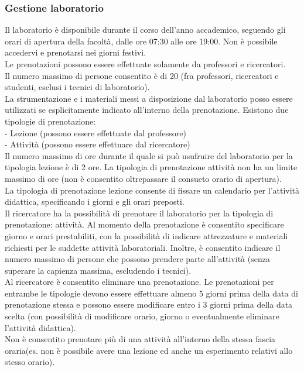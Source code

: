 \documentclass[11pt,a4paper]{report}
\begin{document}
\subsubsection{Gestione laboratorio}
Il laboratorio è disponibile durante il corso dell’anno accademico, seguendo gli orari di apertura della facoltà, dalle ore 07:30 alle ore 19:00. Non è possibile accedervi e prenotarsi nei giorni festivi. \\
Le prenotazioni possono essere effettuate solamente da professori e ricercatori. \\
Il numero massimo di persone consentito è di 20 (fra professori, ricercatori e studenti, esclusi i tecnici di laboratorio). \\
La strumentazione e i materiali messi a disposizione dal laboratorio posso essere utilizzati se esplicitamente indicato all’interno della prenotazione. 
Esistono due tipologie di prenotazione: \\
-	Lezione (possono essere effettuate dal professore) \\
-	Attività (possono essere effettuare dal ricercatore)\\
Il numero massimo di ore durante il quale si può usufruire del laboratorio per la tipologia lezione è di 2 ore. La tipologia di prenotazione attività non ha un limite massimo di ore (non è consentito oltrepassare il consueto orario di apertura). \\
La tipologia di prenotazione lezione consente di fissare un calendario per l’attività didattica, specificando i giorni e gli orari preposti. \\
Il ricercatore ha la possibilità di prenotare il laboratorio per la tipologia di prenotazione: attività. Al momento della prenotazione è consentito specificare giorno e orari prestabiliti, con la possibilità di indicare attrezzature e materiali richiesti per le suddette attività laboratoriali. Inoltre, è consentito indicare il numero massimo di persone che possono prendere parte all’attività (senza superare la capienza massima, escludendo i tecnici). \\
Al ricercatore è consentito eliminare una prenotazione. Le prenotazioni per entrambe le tipologie devono essere effettuare almeno 5 giorni prima della data di prenotazione stessa e possono essere modificare entro i 3 giorni prima della data scelta (con possibilità di modificare orario, giorno o eventualmente eliminare l’attività didattica).\\ 
Non è consentito prenotare più di una attività all’interno della stessa fascia oraria(es. non è possibile avere una lezione ed anche un esperimento relativi allo stesso orario). 
\end{document}
